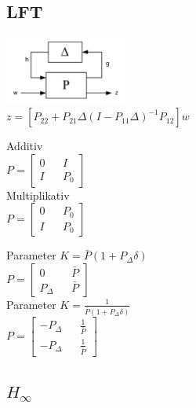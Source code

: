 \subsection{LFT}
	\parbox{6cm}{
	\includegraphics[width=4cm]{./bilder/rob_lft.png}\\
	$z=\left[ P_{22} + P_{21} \Delta(I-P_{11}\Delta)^{-1}P_{12}\right]w$}
	\parbox{4cm}{
		Additiv\\
		$P=\begin{bmatrix}
			0 && I \\
			I && P_0
		\end{bmatrix}$\\
		Multiplikativ\\
		$P=\begin{bmatrix}
			0 && P_0 \\
			I && P_0
		\end{bmatrix}$
		}
	\parbox{5cm}{
		Parameter $K=\bar{P}(1+P_\Delta\delta)$\\
		$P=\begin{bmatrix}
			0 && \bar{P} \\
			P_\Delta && \bar{P}
		\end{bmatrix}$\\
		Parameter $K=\frac{1}{\bar{P}(1+P_\Delta\delta)}$\\
		$P=\begin{bmatrix}
			-P_\Delta && \frac{1}{\bar{P}} \\
			-P_\Delta && \frac{1}{\bar{P}}
		\end{bmatrix}$
		}

\subsection{$H_\infty$}
